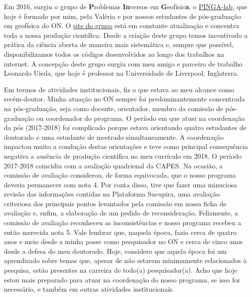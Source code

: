 Em 2016, surgiu o grupo de \textbf{P}roblemas \textbf{In}versos 
em \textbf{G}eofísic\textbf{a}, o \href{https://www.pinga-lab.org/}{PINGA-lab}, 
que hoje é formado por mim, pela Valéria e por nossos estudantes de 
pós-graduação em geofísica do ON. O \href{https://www.pinga-lab.org/}{site do grupo} 
está em constante atualização e concentra toda a nossa produção científica. 
Desde a criação deste grupo temos incentivado a prática da ciência aberta de maneira 
mais sistemática e, sempre que possível, disponibilizamos todos os códigos desenvolvidos 
ao longo dos trabalhos na internet. A concepção deste grupo surgiu com meu amigo e 
parceiro de trabalho Leonardo Uieda, que hoje é professor na Universidade de Liverpool,
Inglaterra.

Em termos de atividades institucionais, fiz o que estava ao meu alcance como recém-doutor.
Minha atuação no ON sempre foi predominantemente concentrada na pós-graduação, seja como
docente, orientador, membro da comissão de pós-graduação ou coordenador do programa.
O período em que atuei na coordenação da pós (2017-2018) foi complicado porque estava
orientando quatro estudantes de doutorado e uma estudante de mestrado simultaneamente. 
A coordenação impactou muito a condução destas orientações e teve como principal
consequência negativa a ausência de produção científica no meu currículo em 2018. 
O período 2017-2018 coincidiu com a avaliação quadrienal da CAPES.
Na ocasião, a comissão de avaliação considerou, de forma equivocada, que o nosso programa 
deveria permanecer com nota 4. Por conta disso, tive que fazer uma 
minuciosa revisão das informações contidas na Plataforma Sucupira, 
uma avaliação criteriosa dos principais pontos levantados pela comissão em nossa 
ficha de avaliação e, enfim, a elaboração de um pedido de reconsideração. 
Felizmente, a comissão de avaliação reconheceu as inconsistências e nosso programa 
recebeu a então merecida nota 5. Vale lembrar que, naquela época, fazia cerca de quatro anos 
e meio desde a minha posse como pesquisador no ON e cerca de cinco anos desde a defesa do 
meu doutorado. 
Hoje, considero que aquela época foi um aprendizado sobre temas que, apesar de não
estarem minimamente relacionados à pesquisa, estão presentes na carreira de todo(a)
pesquisador(a). Acho que hoje estou mais preparado para atuar na coordenação do nosso
programa, se isso for necessário, e também em outras atividades institucionais.

